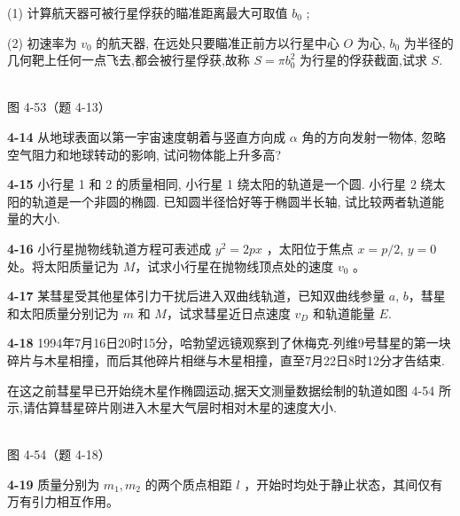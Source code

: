 (1) 计算航天器可被行星俘获的瞄准距离最大可取值 $b_{0}$ ;

(2) 初速率为 $v_{0}$ 的航天器, 在远处只要瞄准正前方以行星中心 $O$ 为心, $b_{0}$ 为半径的几何靶上任何一点飞去,都会被行星俘获,故称 $S=\pi b_{0}^{2}$ 为行星的俘获截面,试求 $S$.

\begin{center}
\resizebox{0.42\textwidth}{!}{}\\[4pt]
{\small 图 4-53（题 4-13）}
\end{center}

\newpage

\textbf{4-14} 从地球表面以第一宇宙速度朝着与竖直方向成 $\alpha$ 角的方向发射一物体, 忽略空气阻力和地球转动的影响, 试问物体能上升多高?

\newpage

\textbf{4-15} 小行星 1 和 2 的质量相同, 小行星 1 绕太阳的轨道是一个圆. 小行星 2 绕太阳的轨道是一个非圆的椭圆. 已知圆半径恰好等于椭圆半长轴, 试比较两者轨道能量的大小.

\newpage

\textbf{4-16} 小行星抛物线轨道方程可表述成 $y^{2}=2px$ ，太阳位于焦点 $x=p/2$, $y=0$ 处。将太阳质量记为 $M$，试求小行星在抛物线顶点处的速度 $v_{0}$ 。

\newpage

\textbf{4-17} 某彗星受其他星体引力干扰后进入双曲线轨道，已知双曲线参量 $a$, $b$，彗星和太阳质量分别记为 $m$ 和 $M$，试求彗星近日点速度 $v_{D}$ 和轨道能量 $E$.

\newpage

\textbf{4-18} 1994年7月16日20时15分，哈勃望远镜观察到了休梅克-列维9号彗星的第一块碎片与木星相撞，而后其他碎片相继与木星相撞，直至7月22日8时12分才告结束.

在这之前彗星早已开始绕木星作椭圆运动,据天文测量数据绘制的轨道如图 4-54 所示,请估算彗星碎片刚进入木星大气层时相对木星的速度大小.

\begin{center}
\resizebox{0.62\textwidth}{!}{}\\[4pt]
{\small 图 4-54（题 4-18）}
\end{center}

\newpage

\textbf{4-19} 质量分别为 $m_{1}, m_{2}$ 的两个质点相距 $l$ ，开始时均处于静止状态，其间仅有万有引力相互作用。

